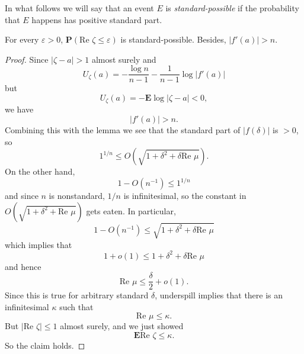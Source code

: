 \documentclass[12pt]{article}
\begin{document}
In what follows we will say that an event $E$ is \emph{standard-possible} if the probability that $E$ happens has positive standard part.

\begin{lemma}
For every $\varepsilon > 0$, $\mathbf P(\text{Re }\zeta \leq \varepsilon)$ is standard-possible.
Besides, $|f'(a)| > n$.
\end{lemma}
\begin{proof}
Since $|\zeta - a| > 1$ almost surely and
$$U_\zeta(a) = -\frac{\log n}{n - 1} - \frac{1}{n - 1} \log |f'(a)|$$
but
$$U_\zeta(a) = -\mathbf E \log |\zeta - a| < 0,$$
we have
$$|f'(a)| > n.$$
Combining this with the lemma we see that the standard part of $|f(\delta)|$ is $> 0$, so
$$1^{1/n} \leq O(\sqrt{1 + \delta^2 + \delta\text{Re }\mu}).$$
On the other hand,
$$1 - O(n^{-1}) \leq 1^{1/n}$$
and since $n$ is nonstandard, $1/n$ is infinitesimal, so the constant in $O(\sqrt{1 + \delta^2 + \text{Re }\mu})$ gets eaten. In particular,
$$1 - O(n^{-1}) \leq \sqrt{1 + \delta^2 + \delta\text{Re }\mu}$$
which implies that
$$1 + o(1) \leq 1 + \delta^2 + \delta\text{Re }\mu$$
and hence
$$\text{Re }\mu \leq \frac{\delta}{2} + o(1).$$
Since this is true for arbitrary standard $\delta$, underspill implies that there is an infinitesimal $\kappa$ such that
$$\text{Re }\mu \leq \kappa.$$
But $|\text{Re }\zeta| \leq 1$ almost surely, and we just showed
$$\mathbf E\text{Re }\zeta \leq \kappa.$$
So the claim holds.
\end{proof}
\end{document}
